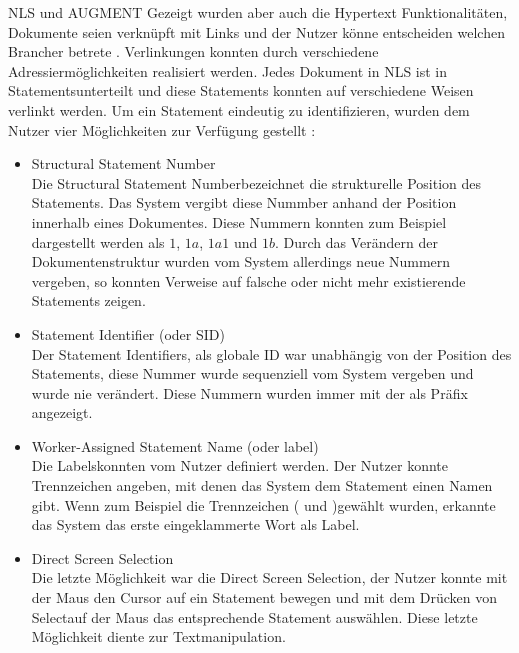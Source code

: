 \begin{section}{NLS und AUGMENT}
Gezeigt wurden aber auch die Hypertext Funktionalitäten, Dokumente seien verknüpft mit Links und der Nutzer könne entscheiden welchen \glqq Branch\grqq{ }er betrete \cite{MotherOfDemo1968}. Verlinkungen konnten durch verschiedene Adressiermöglichkeiten realisiert werden. Jedes Dokument in NLS ist in \glqq Statements\grqq{ }unterteilt und diese Statements konnten auf verschiedene Weisen verlinkt werden. Um ein Statement eindeutig zu identifizieren, wurden dem Nutzer vier Möglichkeiten zur Verfügung gestellt \cite{Engelbart1984}: 

\begin{itemize}
\item Structural Statement Number\hfill \\
Die \glqq Structural Statement Number\grqq{ }bezeichnet die strukturelle Position des Statements. Das System vergibt diese Nummber anhand der Position innerhalb eines Dokumentes. Diese Nummern konnten zum Beispiel dargestellt werden als $1$, $1a$, $1a1$ und $1b$. Durch das Verändern der Dokumentenstruktur wurden vom System allerdings neue Nummern vergeben, so konnten Verweise auf falsche oder nicht mehr existierende Statements zeigen.
\item Statement Identifier (oder SID)\hfill \\
Der \glqq Statement Identifiers\grqq, als globale ID war unabhängig von der Position des Statements, diese Nummer wurde sequenziell vom System vergeben und wurde nie verändert. Diese Nummern wurden immer mit der \grqq{ }als Präfix angezeigt.
\item Worker-Assigned Statement Name (oder label)\hfill \\
Die \glqq Labels\grqq{ }konnten vom Nutzer definiert werden. Der Nutzer konnte Trennzeichen angeben, mit denen das System dem Statement einen Namen gibt. Wenn zum Beispiel die Trennzeichen \glqq (\grqq{ } und \glqq )\grqq{ }gewählt wurden, erkannte das System das erste eingeklammerte Wort als Label.
\item Direct Screen Selection\hfill \\
Die letzte Möglichkeit war die \glqq Direct Screen Selection\grqq, der Nutzer konnte mit der Maus den Cursor auf ein Statement bewegen und mit dem Drücken von \glqq Select\grqq{ }auf der Maus das entsprechende Statement auswählen. Diese letzte Möglichkeit diente zur Textmanipulation.
\end{itemize}


\end{section}
